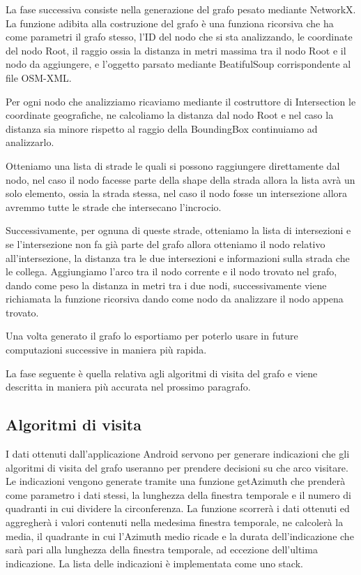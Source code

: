 \documentclass[12pt,a4paper,openright,twoside]{report}
\begin{document}
La fase successiva consiste nella generazione del grafo pesato mediante NetworkX. La funzione adibita alla costruzione del grafo è una funziona ricorsiva che ha come parametri il grafo stesso, l'ID del nodo che si sta analizzando, le coordinate del nodo Root, il raggio ossia la distanza in metri massima tra il nodo Root e il nodo da aggiungere, e l'oggetto parsato mediante BeatifulSoup corrispondente al file OSM-XML.

Per ogni nodo che analizziamo ricaviamo mediante il costruttore di Intersection le coordinate geografiche, ne calcoliamo la distanza dal nodo Root e nel caso la distanza sia minore rispetto al raggio della BoundingBox continuiamo ad analizzarlo.

Otteniamo una lista di strade le quali si possono raggiungere direttamente dal nodo, nel caso il nodo facesse parte della shape della strada allora la lista avrà un solo elemento, ossia la strada stessa, nel caso il nodo fosse un intersezione allora avremmo tutte le strade che intersecano l'incrocio.

Successivamente, per ognuna di queste strade, otteniamo la lista di intersezioni e se l'intersezione non fa già parte del grafo allora otteniamo il nodo relativo all'intersezione, la distanza tra le due intersezioni e informazioni sulla strada che le collega. Aggiungiamo l'arco tra il nodo corrente e il nodo trovato nel grafo, dando come peso la distanza in metri tra i due nodi, successivamente viene richiamata la funzione ricorsiva dando come nodo da analizzare il nodo appena trovato.

Una volta generato il grafo lo esportiamo per poterlo usare in future computazioni successive in maniera più rapida.

La fase seguente è quella relativa agli algoritmi di visita del grafo e viene descritta in maniera più accurata nel prossimo paragrafo.
\newpage
\subsection{Algoritmi di visita}
I dati ottenuti dall'applicazione Android servono per generare indicazioni che gli algoritmi di visita del grafo useranno per prendere decisioni su che arco visitare.
Le indicazioni vengono generate tramite una funzione getAzimuth che prenderà come parametro i dati stessi, la lunghezza della finestra temporale e il numero di quadranti in cui dividere la circonferenza. La funzione scorrerà i dati ottenuti ed aggregherà i valori contenuti nella medesima finestra temporale, ne calcolerà la media, il quadrante in cui l'Azimuth medio ricade e la durata dell'indicazione che sarà pari alla lunghezza della finestra temporale, ad eccezione dell'ultima indicazione.
La lista delle indicazioni è implementata come uno stack.
\end{document}
